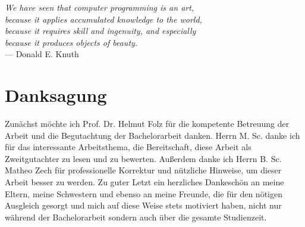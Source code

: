 
\begin{flushright}{\slshape    
    We have seen that computer programming is an art, \\ 
    because it applies accumulated knowledge to the world, \\ 
    because it requires skill and ingenuity, and especially \\
    because it produces objects of beauty.} \\ \medskip
    --- Donald E. Knuth \cite{knuth:1974}
\end{flushright}

\bigskip

\begingroup
	\let\clearpage\relax
	\let\cleardoublepage\relax
	\let\cleardoublepage\relax
	\chapter*{Danksagung}
	
	Zunächst möchte ich Prof. Dr. Helmut Folz für die kompetente Betreuung der Arbeit und die Begutachtung der Bachelorarbeit danken.
	Herrn M. Sc. danke ich für das interessante Arbeitsthema, die Bereitschaft, diese Arbeit als Zweitgutachter zu lesen und zu bewerten.
	Außerdem danke ich Herrn B. Sc. Matheo Zech für professionelle Korrektur und nützliche Hinweise, um dieser Arbeit besser zu werden.
	Zu guter Letzt ein herzliches Dankeschön an meine Eltern, meine Schwestern und ebenso
	an meine Freunde, die für den nötigen Ausgleich gesorgt und mich auf diese Weise stets
	motiviert haben, nicht nur während der Bachelorarbeit sondern auch über die gesamte
	Studienzeit.
\endgroup

